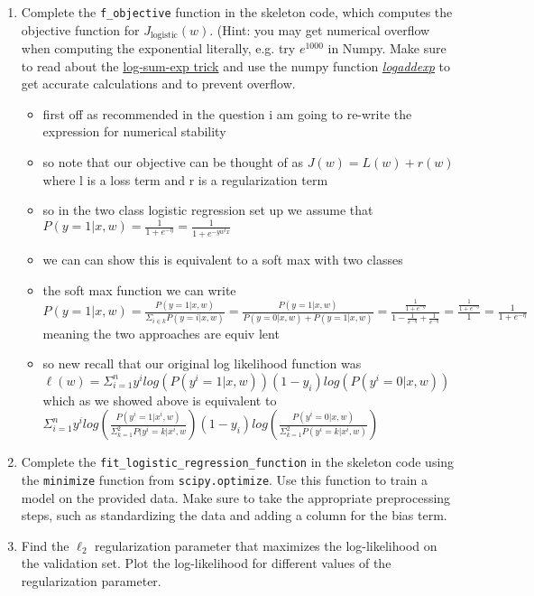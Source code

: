 \documentclass{article}
\theoremstyle{plain}
\theoremstyle{definition}
\begin{document}
\begin{enumerate}
\item Complete the \texttt{f\_objective} function in the skeleton code,
which computes the objective function for $J_{\text{logistic}}(w)$.
(Hint: you may get numerical overflow when computing the exponential literally,
e.g. try $e^{1000}$ in Numpy.
Make sure to read about the
\href{https://blog.feedly.com/tricks-of-the-trade-logsumexp/}{log-sum-exp trick}
and use the numpy function
\textit{ \href{https://docs.scipy.org/doc/numpy/reference/generated/numpy.logaddexp.html}{logaddexp}
}
to get accurate calculations
and to prevent overflow.

\begin{itemize}
    \color{blue}
    \item first off as recommended in the question i am going to re-write the expression for numerical stability
    \item so note that our objective can be thought of as $J(w)=L(w)+r(w)$ where l is a loss term and r is a regularization term 
   \item so in the two class logistic regression set up we assume that $P(y=1|x,w)=\frac{1}{1+e^{-\eta}}=\frac{1}{1+e^{-yw^tx}}$
   \item we can can show this is equivalent to a soft max with two classes
    \item the soft max function we can write $P(y=1|x,w)=\frac{P(y=1|x,w)}{\Sigma_{i\in k}P(y=i|x,w)}=\frac{P(y=1|x,w)}{P(y=0|x,w)+P(y=1|x,w)}=\frac{\frac{1}{1+e^{-\eta}}}{1-\frac{1}{e^{-\eta}}+\frac{1}{e^{-\eta}}}=\frac{\frac{1}{1+e^{-\eta}}}{1}=\frac{1}{1+e^{-\eta}}$ meaning the two approaches are equiv lent 
    \item so new recall that our original log likelihood function was $\ell(w)=\Sigma_{i=1}^{n}y^ilog(P(y^i=1|x,w))(1-y_i)log(P(y^i=0|x,w))$ which as we showed above is equivalent to $\Sigma_{i=1}^{n}y^ilog(\frac {P(y^i=1|x^i,w)}{\Sigma_{k=1}^{2}P(y^i=k|x^i,w})(1-y_i)log(\frac{P(y^i=0|x,w)}{\Sigma_{k=1}^{2}P(y^i=k|x^i,w)})$
\end{itemize}

\item Complete the \texttt{fit\_logistic\_regression\_function} in the skeleton
code using the \texttt{minimize} function from \texttt{scipy.optimize}.
Use this function to train
a model on the provided data. Make sure to take the appropriate preprocessing
steps, such as standardizing the data and adding a column for the
bias term. 

\item Find the $\ell_{2}$ regularization parameter that maximizes the log-likelihood
on the validation set. Plot the log-likelihood for different values
of the regularization parameter. 


\end{enumerate}
\end{document}
